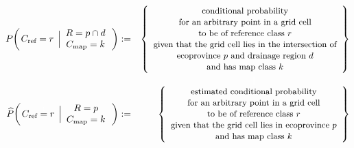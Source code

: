 \vskip -0.5cm
\begin{eqnarray*}
P\!\left(
	\left.
		C_{\textnormal{ref}} \overset{{\color{white}1}}{=} r
		\,\;\right\vert\!
	\begin{array}{c} R = p \cap d \\ C_{\textnormal{map}} = k \end{array}
	\,\right)
& := &
	\left\{\begin{array}{c}
	\textnormal{\small conditional probability}
	\\
	\textnormal{\small for an arbitrary point in a grid cell}
	\\
	\textnormal{\small to be of reference class $r$}
	\\
	\textnormal{\small given that the grid cell lies in the intersection of}
	\\
	\textnormal{\small ecoprovince $p$ and drainage region $d$}
	\\
	\textnormal{\small and has map class $k$}
	\end{array}\right\}
\\
\widehat{P}\!\left(
	\left.
		C_{\textnormal{ref}} \overset{{\color{white}1}}{=} r
		\,\;\right\vert\!
	\begin{array}{c} R = p \\ C_{\textnormal{map}} = k \end{array}
	\,\right)
& := &
	\overset{{\color{white}\textnormal{\large$1$}}}{
		\left\{\begin{array}{c}
		\textnormal{\small estimated conditional probability}
		\\
		\textnormal{\small for an arbitrary point in a grid cell}
		\\
		\textnormal{\small to be of reference class $r$}
		\\
		\textnormal{\small given that the grid cell lies in ecoprovince $p$}
		\\
		\textnormal{\small and has map class $k$}
		\end{array}\right\}
	}
\end{eqnarray*}

